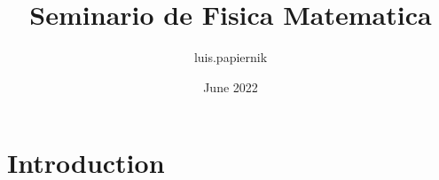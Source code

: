 \documentclass{article}
\title{Seminario de Fisica Matematica}
\author{luis.papiernik }
\date{June 2022}
\begin{document}
\maketitle

\section{Introduction}
\end{document}
